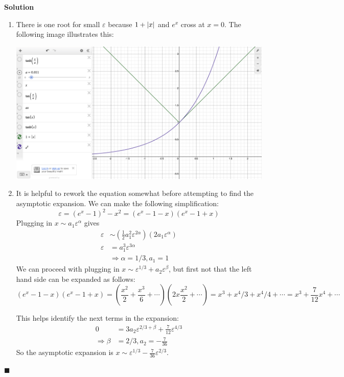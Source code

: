 \documentclass[11pt]{article}
\newcommand{\vep}{\varepsilon}
\DeclarePairedDelimiter\abs{\lvert}{\rvert}
\theoremstyle{problemstyle}
\newenvironment{solution}
  {\noindent\textbf{Solution}\quad}
  {\hfill$\blacksquare$\par\vspace{1em}}
\begin{document}
\begin{solution}
  \begin{enumerate}
    \item There is one root for small $\vep$ because $1 + \abs{x}$ and $e^x$
      cross at $x = 0$. The following image illustrates this:
      \begin{center}
        \includegraphics[width=.80\textwidth]{19.png}
      \end{center}
    \item It is helpful to rework the equation somewhat before attempting to
      find the asymptotic expansion. We can make the following simplification:
      \[ \vep = (e^x - 1)^2 - x^2 = (e^x - 1 - x)(e^x - 1 + x) \]
      Plugging in $x \sim a_1 \vep^\alpha$ gives
      \begin{align*}
        \vep & \sim \left(\frac{1}{2}a_1^2\vep^{2\alpha}\right)\left(2a_1\vep^\alpha\right) \\
        \vep & = a_1^3\vep^{3\alpha} \\
             & \Rightarrow \alpha = 1/3, a_1 = 1
      \end{align*}
      We can proceed with plugging in $x \sim \vep^{1/3} + a_2 \vep^\beta$, but
      first not that the left hand side can be expanded as follows:
      \[ (e^x - 1 - x)(e^x - 1 + x) = \left( \frac{x^2}{2} + \frac{x^3}{6} +
      \cdots \right)\left( 2x \frac{x^2}{2} + \cdots \right) = x^3 + x^4/3 +
    x^4/4 + \cdots = x^3 + \frac{7}{12}x^4 + \cdots \]

      This helps identify the next terms in the expansion:
      \begin{align*}
        0 & = 3a_2\vep^{2/3 + \beta} + \frac{7}{12}\vep^{4/3} \\
        \Rightarrow \beta & = 2/3, a_2 = -\frac{7}{36}
      \end{align*}
      So the asymptotic expansion is $x \sim \vep^{1/3} -
      \frac{7}{36}\vep^{2/3}$.
  \end{enumerate}
\end{solution}
\end{document}
